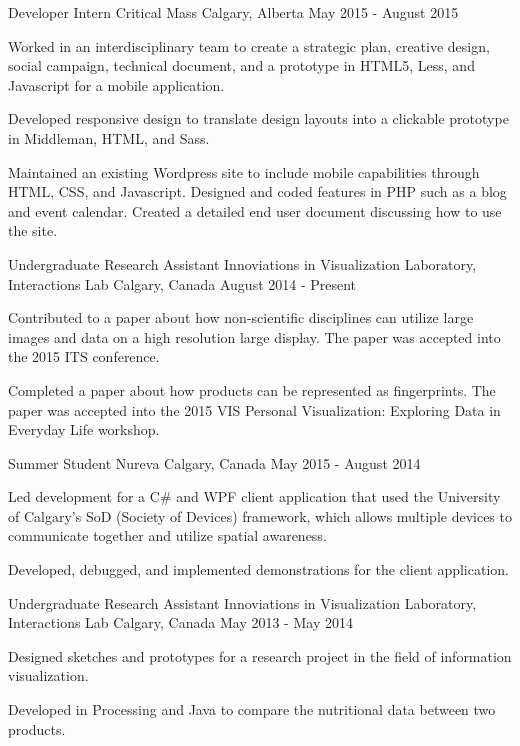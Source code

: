 \begin{cventries}
  \cventry
    {Developer Intern}
    {Critical Mass}
    {Calgary, Alberta}
    {May 2015 - August 2015}
    {
      \begin{cvitems}
        \item {Worked in an interdisciplinary team to create a strategic plan, creative design, social campaign, technical document, and a prototype in HTML5, Less, and Javascript for a mobile application.}
        \item {Developed responsive design to translate design layouts into a clickable prototype in Middleman, HTML, and Sass.}
        \item {Maintained an existing Wordpress site to include mobile capabilities through HTML, CSS, and Javascript. Designed and coded features in PHP such as a blog and event calendar. Created a detailed end user document discussing how to use the site.}
      \end{cvitems}
    }
  \cventry
    {Undergraduate Research Assistant}
    {Innoviations in Visualization Laboratory, Interactions Lab}
    {Calgary, Canada}
    {August 2014 - Present}
    {
      \begin{cvitems}
        \item {Contributed to a paper about how non-scientific disciplines can utilize large images and data on a high resolution large display. The paper was accepted into the 2015 ITS conference.}
        \item {Completed a paper about how products can be represented as fingerprints. The paper was accepted into the 2015 VIS Personal Visualization: Exploring Data in Everyday Life workshop.}
      \end{cvitems}
    }
  \cventry
    {Summer Student}
    {Nureva}
    {Calgary, Canada}
    {May 2015 - August 2014}
    {
      \begin{cvitems}
        \item {Led development for a C\# and WPF client application that used the University of Calgary’s SoD (Society of Devices) framework, which allows multiple devices to communicate together and utilize spatial awareness.}
        \item {Developed, debugged, and implemented demonstrations for the client application.}
      \end{cvitems}  
    }
  \cventry
    {Undergraduate Research Assistant}
    {Innoviations in Visualization Laboratory, Interactions Lab}
    {Calgary, Canada}
    {May 2013 - May 2014}
    {
      \begin{cvitems}
        \item {Designed sketches and prototypes for a research project in the field of information visualization.}
        \item {Developed in Processing and Java to compare the nutritional data between two products.}
      \end{cvitems}
    }
\end{cventries}
